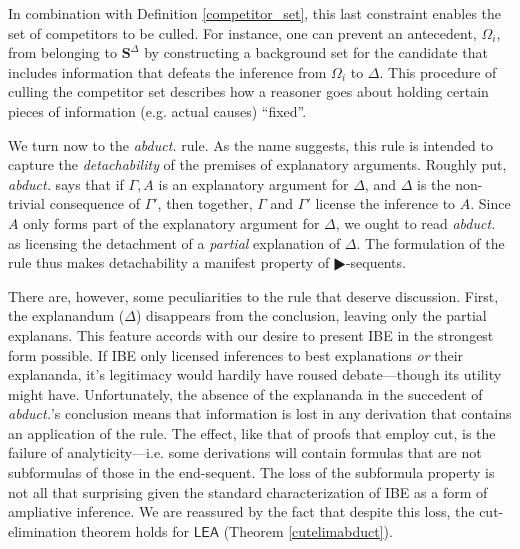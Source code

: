 \documentclass{article}
\theoremstyle{definition}
\theoremstyle{definition}
\theoremstyle{definition}
\theoremstyle{definition}
\theoremstyle{remark}
\theoremstyle{definition}
\theoremstyle{definition}
\begin{document}
In combination with Definition \ref{competitor_set}, this last constraint enables the set of competitors to be culled. For instance, one can prevent an antecedent, $ \Omega_i $, from belonging to $ \mathbf{S}^\Delta $ by constructing a background set for the candidate that includes information that defeats the inference from $ \Omega_i $ to $ \Delta $. This procedure of culling the competitor set describes how a reasoner goes about holding certain pieces of information (e.g. actual causes) ``fixed''.


We turn now to the \textit{abduct.} rule. As the name suggests, this rule is intended to capture the \textit{detachability} of the premises of explanatory arguments. Roughly put, \textit{abduct.} says that if $ \Gamma, A $ is an explanatory argument for $ \Delta $, and $ \Delta $ is the non-trivial consequence of $ \Gamma' $, then together, $ \Gamma $ and $ \Gamma' $ license the inference to $ A $. Since $ A $ only forms part of the explanatory argument for $ \Delta $, we ought to read \textit{abduct.} as licensing the detachment of a \textit{partial} explanation of $ \Delta $. The formulation of the rule thus makes detachability a manifest property of $ \RHD $-sequents. 

There are, however, some peculiarities to the rule that deserve discussion. First, the explanandum ($ \Delta $) disappears from the conclusion, leaving only the partial explanans. This feature accords with our desire to present IBE in the strongest form possible. If IBE only licensed inferences to best explanations \textit{or} their explananda, it's legitimacy would hardily have roused debate---though its utility might have. Unfortunately, the absence of the explananda in the succedent of \textit{abduct.}'s conclusion means that information is lost in any derivation that contains an application of the rule. The effect, like that of proofs that employ cut, is the failure of analyticity---i.e. some derivations will contain formulas that are not subformulas of those in the end-sequent. The loss of the subformula property is not all that surprising given the standard characterization of IBE as a form of ampliative inference. We are reassured by the fact that despite this loss, the cut-elimination theorem holds for $ \mathsf{LEA} $ (Theorem \ref{cutelimabduct}).
\end{document}
